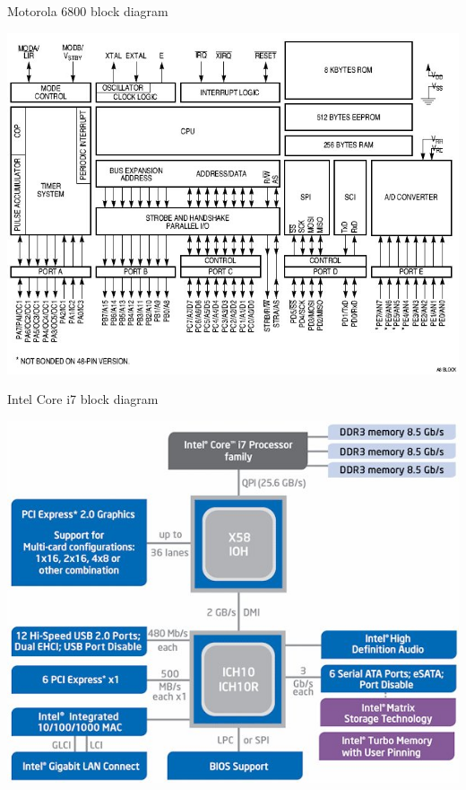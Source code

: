 \begin{frame}{Motorola 6800 block diagram}
  \begin{center}
    \includegraphics[scale=0.4]{6800_block_diagram.jpg}
  \end{center}
\end{frame}

\begin{frame}{Intel Core i7 block diagram}
  \begin{center}
    \includegraphics[scale=0.4]{core_i7_block_diagram.jpg}
  \end{center}
\end{frame}

